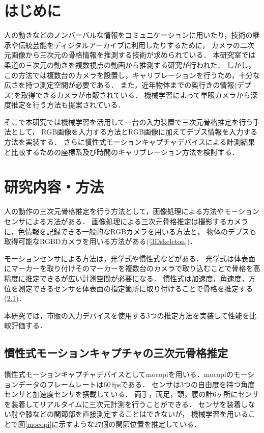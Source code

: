 \documentclass[a4j, fleqn, 12pt]{jsreport}
\begin{document}
\maketitle
\tableofcontents
\cleardoublepage
{}

\chapter{はじめに}
人の動きなどのノンバーバルな情報をコミュニケーションに用いたり，技術の継承や伝統芸能をディジタルアーカイブに利用したりするために，
カメラの二次元画像から三次元の骨格情報を推測する技術が求められている．
本研究室では柔道の三次元の動きを複数視点の動画から推測する研究\cite{turugi}が行われた．
しかし，この方法では複数台のカメラを設置し，キャリブレーションを行うため，十分な広さを持つ測定空間が必要である．
また，近年物体までの奥行きの情報(デプス)を取得できるカメラが市販されている．
機械学習によって単眼カメラから深度推定を行う方法も提案されている\cite{depth}．

そこで本研究では機械学習を活用して一台の入力装置で三次元骨格推定を行う手法として，
RGB画像を入力する方法とRGB画像に加えてデプス情報を入力する方法を実装する．
さらに慣性式モーションキャプチャデバイスによる計測結果と比較するための座標系及び時間のキャリブレーション方法を検討する．

\chapter{研究内容・方法}
人の動作の三次元骨格推定を行う方法として，画像処理による方法やモーションセンサによる方法がある．
画像処理による三次元骨格推定は撮影するカメラに，色情報を記録できる一般的なRGBカメラを用いる方法と，
物体のデプスも取得可能なRGBDカメラを用いる方法がある(\ref{3Dskeleton})．

モーションセンサによる方法は，光学式や慣性式などがある．
光学式は体表面にマーカーを取り付けそのマーカーを複数台のカメラで取り込むことで骨格を高精度に推定できるが広い計測空間が必要になる．
慣性式は加速度，角速度，方位を測定できるセンサを体表面の指定箇所に取り付けることで骨格を推定する(\ref{motion})．


本研究では，市販の入力デバイスを使用する3つの推定方法を実装して性能を比較評価する．

\section{慣性式モーションキャプチャの三次元骨格推定}\label{motion}
慣性式モーションキャプチャデバイスとしてmocopiを用いる．mocopiのモーションデータのフレームレートは60\,fpsである．
センサは3つの自由度を持つ角度センサと加速度センサを搭載している．
両手，両足，頭，腰の計6ヶ所にセンサを装着してリアルタイムに三次元計測を行うことができる．
センサを装着しない肘や膝などの関節部を直接測定することはできないが，
機械学習を用いることで図\ref{mocopi}に示すような27個の関節位置を推定している．
\end{document}
